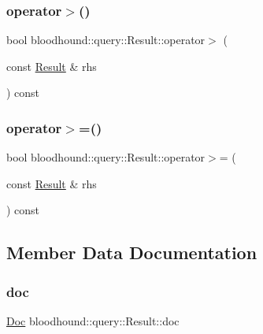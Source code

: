 \subsubsection{\texorpdfstring{operator$>$()}{operator>()}}
{\footnotesize\ttfamily bool bloodhound\+::query\+::\+Result\+::operator$>$ (\begin{DoxyParamCaption}\item[{const \hyperlink{structbloodhound_1_1query_1_1Result}{Result} \&}]{rhs }\end{DoxyParamCaption}) const\hspace{0.3cm}{\ttfamily [inline]}}

\mbox{\label{structbloodhound_1_1query_1_1Result_a5af24f990ab7687d25e25b1f66dfb8a3}} 
\subsubsection{\texorpdfstring{operator$>$=()}{operator>=()}}
{\footnotesize\ttfamily bool bloodhound\+::query\+::\+Result\+::operator$>$= (\begin{DoxyParamCaption}\item[{const \hyperlink{structbloodhound_1_1query_1_1Result}{Result} \&}]{rhs }\end{DoxyParamCaption}) const\hspace{0.3cm}{\ttfamily [inline]}}



\subsection{Member Data Documentation}
\mbox{\label{structbloodhound_1_1query_1_1Result_a5f6acbb120aaf435333e410c0595962a}} 
\subsubsection{\texorpdfstring{doc}{doc}}
{\footnotesize\ttfamily \hyperlink{structbloodhound_1_1Doc}{Doc} bloodhound\+::query\+::\+Result\+::doc}

